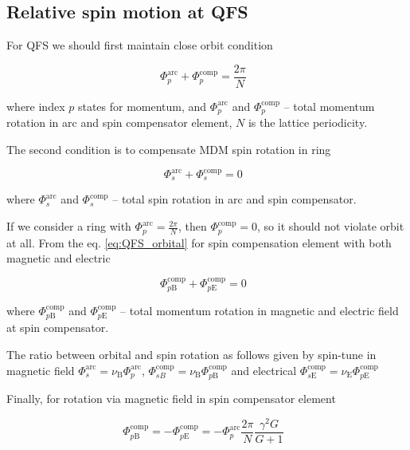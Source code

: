 \documentclass[submitting]{nst}
\begin{document}
\subsection{Relative spin motion at QFS}    

For QFS we should first maintain close orbit condition

\begin{equation}
	\Phi_p^{\textrm{arc}}+\Phi_{p}^{\textrm{comp}}=\frac{2\pi}{N}\ \ \
	\label{eq:QFS_orbital}
\end{equation}

\noindent where index $p$ states for momentum, and $\Phi_p^{\textrm{arc}}$ and $\Phi_{p}^{\textrm{comp}}$ -- total momentum rotation in arc and spin compensator element, $N$ is the lattice periodicity.

\par The second condition is to compensate MDM spin rotation in ring 

\begin{equation}
	\Phi_s^{\textrm{arc}}+\Phi_{s}^{\textrm{comp}}=0\ \ \
	\label{eq:QFS_spin}
\end{equation}

\noindent where $\Phi_s^{\textrm{arc}}$ and $\Phi_{s}^{\textrm{comp}}$ -- total spin rotation in arc and spin compensator.
\par  If we consider a ring with $\Phi_p^{\textrm{arc}} = \frac{2\pi}{N}$, then $\Phi_{p}^{\textrm{comp}} = 0$, so it should not violate orbit at all. From the eq. \ref{eq:QFS_orbital} for spin compensation element with both magnetic and electric 

\begin{equation}
	\Phi_{p\textrm{B}}^{\textrm{comp}}+{\Phi}_{p\textrm{E}}^{\textrm{comp}} = 0\ \ \ 
\end{equation}

\noindent where $\Phi_{p\textrm{B}}^{\textrm{comp}}$ and ${\Phi}_{p\textrm{E}}^{\textrm{comp}}$ -- total momentum rotation in magnetic and electric field at spin compensator.

The ratio between orbital and spin rotation as follows given by spin-tune in magnetic field $\Phi_{s}^{\text{arc}} = \nu_{\text{B}}\Phi_{p}^{\text{arc}}$, $\Phi_{sB}^{\text{comp}} = \nu_{\text{B}}\Phi_{p\text{B}}^{\text{comp}}$ and electrical $\Phi_{s\text{E}}^{\text{comp}} = \nu_{\text{E}}\Phi_{p\text{E}}^{\text{comp}}$

Finally, for rotation via magnetic field in spin compensator element

\begin{equation}
	\Phi_{p\textrm{B}}^{\textrm{comp}} = -\Phi_{p\textrm{E}}^{\textrm{comp}} = -{\Phi}_{p}^{\text{arc}}\frac{2\pi}{N}\frac{\gamma^2 G}{G+1}\ \ \ 
	\label{eq:deflection}
\end{equation}
\end{document}
